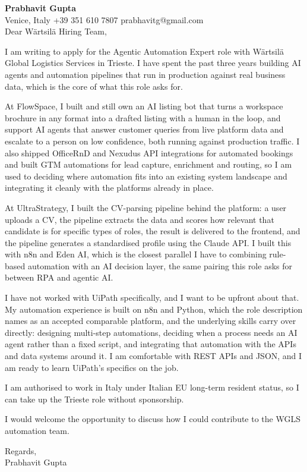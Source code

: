 \documentclass[a4paper,10.5pt]{article}
\begin{document}
\textbf{Prabhavit Gupta}\\
Venice, Italy \textbar{} +39 351 610 7807 \textbar{} prabhavitg@gmail.com\\[10pt]
Dear Wärtsilä Hiring Team,

I am writing to apply for the Agentic Automation Expert role with Wärtsilä Global Logistics Services in Trieste. I have spent the past three years building AI agents and automation pipelines that run in production against real business data, which is the core of what this role asks for.

At FlowSpace, I built and still own an AI listing bot that turns a workspace brochure in any format into a drafted listing with a human in the loop, and support AI agents that answer customer queries from live platform data and escalate to a person on low confidence, both running against production traffic. I also shipped OfficeRnD and Nexudus API integrations for automated bookings and built GTM automations for lead capture, enrichment and routing, so I am used to deciding where automation fits into an existing system landscape and integrating it cleanly with the platforms already in place.

At UltraStrategy, I built the CV-parsing pipeline behind the platform: a user uploads a CV, the pipeline extracts the data and scores how relevant that candidate is for specific types of roles, the result is delivered to the frontend, and the pipeline generates a standardised profile using the Claude API. I built this with n8n and Eden AI, which is the closest parallel I have to combining rule-based automation with an AI decision layer, the same pairing this role asks for between RPA and agentic AI.

I have not worked with UiPath specifically, and I want to be upfront about that. My automation experience is built on n8n and Python, which the role description names as an accepted comparable platform, and the underlying skills carry over directly: designing multi-step automations, deciding when a process needs an AI agent rather than a fixed script, and integrating that automation with the APIs and data systems around it. I am comfortable with REST APIs and JSON, and I am ready to learn UiPath's specifics on the job.

I am authorised to work in Italy under Italian EU long-term resident status, so I can take up the Trieste role without sponsorship.

I would welcome the opportunity to discuss how I could contribute to the WGLS automation team.

Regards,\\
Prabhavit Gupta
\end{document}
